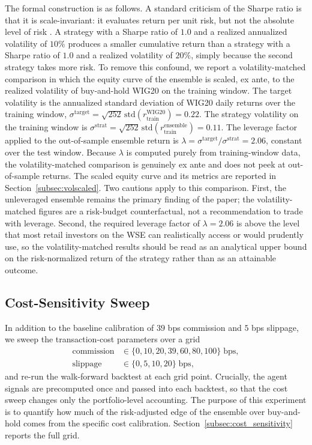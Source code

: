 \documentclass{ieeeaccess}
\newcommand{\Leverage}{\ensuremath{2.06}}
\newcommand{\StrategyTrainVol}{\ensuremath{0.11}}
\newcommand{\BHOosVol}{\ensuremath{0.22}}
\begin{document}
The formal construction is as follows. A standard criticism of the Sharpe ratio is that it is scale-invariant: it evaluates return per unit risk, but not the absolute level of risk \cite{harvey2016}. A strategy with a Sharpe ratio of $1.0$ and a realized annualized volatility of $10\%$ produces a smaller cumulative return than a strategy with a Sharpe ratio of $1.0$ and a realized volatility of $20\%$, simply because the second strategy takes more risk. To remove this confound, we report a volatility-matched comparison in which the equity curve of the ensemble is scaled, ex ante, to the realized volatility of buy-and-hold WIG20 on the training window. The target volatility is the annualized standard deviation of WIG20 daily returns over the training window, $\sigma^{\text{target}} = \sqrt{252}\, \mathrm{std}(r^{\text{WIG20}}_\text{train}) = \BHOosVol{}$. The strategy volatility on the training window is $\sigma^{\text{strat}} = \sqrt{252}\,\mathrm{std}(r^{\text{ensemble}}_\text{train}) = \StrategyTrainVol{}$. The leverage factor applied to the out-of-sample ensemble return is $\lambda = \sigma^{\text{target}} / \sigma^{\text{strat}} = \Leverage{}$, constant over the test window. Because $\lambda$ is computed purely from training-window data, the volatility-matched comparison is genuinely ex ante and does not peek at out-of-sample returns. The scaled equity curve and its metrics are reported in Section~\ref{subsec:volscaled}. Two cautions apply to this comparison. First, the unleveraged ensemble remains the primary finding of the paper; the volatility-matched figures are a risk-budget counterfactual, not a recommendation to trade with leverage. Second, the required leverage factor of $\lambda = \Leverage{}$ is above the level that most retail investors on the WSE can realistically access or would prudently use, so the volatility-matched results should be read as an analytical upper bound on the risk-normalized return of the strategy rather than as an attainable outcome.

\subsection{Cost-Sensitivity Sweep}
\label{subsec:costsweep}

In addition to the baseline calibration of $39$ bps commission and $5$ bps slippage, we sweep the transaction-cost parameters over a grid
\begin{equation}
\begin{aligned}
\mathrm{commission} &\in \{0, 10, 20, 39, 60, 80, 100\}\;\text{bps}, \\
\mathrm{slippage} &\in \{0, 5, 10, 20\}\;\text{bps},
\end{aligned}
\end{equation}
and re-run the walk-forward backtest at each grid point. Crucially, the agent signals are precomputed once and passed into each backtest, so that the cost sweep changes only the portfolio-level accounting. The purpose of this experiment is to quantify how much of the risk-adjusted edge of the ensemble over buy-and-hold comes from the specific cost calibration. Section~\ref{subsec:cost_sensitivity} reports the full grid.
\end{document}
